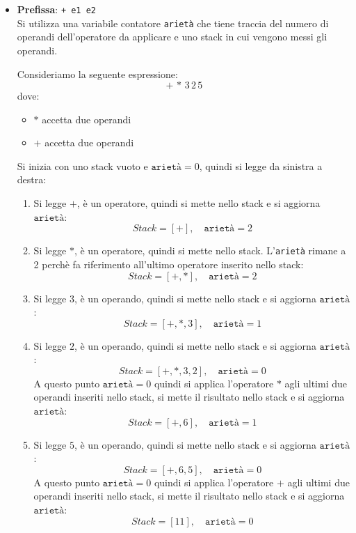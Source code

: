 \documentclass[a4paper]{article}
\begin{document}
\begin{itemize}
\begin{itemize}
      \item \textbf{Prefissa}: \texttt{+ e1 e2}\\
        Si utilizza una variabile contatore \texttt{arietà} che tiene traccia del
        numero di operandi dell'operatore da applicare e uno stack in cui
        vengono messi gli operandi.
        \begin{example}
          Consideriamo la seguente espressione:
          \[
             + \, * \, 3 \, 2 \, 5
          \] 
          dove:
          \begin{itemize}
            \item \( * \) accetta due operandi
            \item \( + \) accetta due operandi
          \end{itemize}
          Si inizia con uno stack vuoto e \( \texttt{arietà} = 0 \), quindi si legge da
          sinistra a destra:
          \begin{enumerate}
            \item Si legge \( + \), è un operatore, quindi si mette nello stack e si
              aggiorna \( \texttt{arietà} \):
              \[
                Stack = [+], \quad \texttt{arietà} = 2
              \]
            \item Si legge \( * \), è un operatore, quindi si mette nello stack.
              L'\texttt{arietà} rimane a 2 perchè fa riferimento all'ultimo operatore
              inserito nello stack:
              \[
                Stack = [+, *], \quad \texttt{arietà} = 2
              \]
            \item Si legge \( 3 \), è un operando, quindi si mette nello stack e si
              aggiorna \( \texttt{arietà} \):
              \[
                Stack = [+, *, 3], \quad \texttt{arietà} = 1
              \]
            \item Si legge \( 2 \), è un operando, quindi si mette nello stack e si
              aggiorna \( \texttt{arietà} \):
              \[
                Stack = [+, *, 3, 2], \quad \texttt{arietà} = 0
              \]
              A questo punto \( \texttt{arietà} = 0 \) quindi si applica l'operatore
              \( * \) agli ultimi due operandi inseriti nello stack, si mette il
              risultato nello stack e si aggiorna \( \texttt{arietà} \):
              \[
                Stack = [+, 6], \quad \texttt{arietà} = 1
              \]
            \item Si legge \( 5 \), è un operando, quindi si mette nello stack e
              si aggiorna \( \texttt{arietà} \):
              \[
                Stack = [+, 6, 5], \quad \texttt{arietà} = 0
              \]
              A questo punto \( \texttt{arietà} = 0 \) quindi si applica l'operatore
              \( + \) agli ultimi due operandi inseriti nello stack, si mette il
              risultato nello stack e si aggiorna \( \texttt{arietà} \):
              \[
                Stack = [11], \quad \texttt{arietà} = 0
              \]
          \end{enumerate}
        \end{example}


\end{itemize}
\end{itemize}
\end{document}

